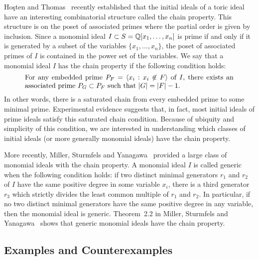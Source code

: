 Ho\c{s}ten and Thomas~\cite{MR2000b:13037} recently established that
the initial ideals of a toric ideal have an interesting combinatorial
structure called the chain property.  This structure is on the poset
of associated primes where the partial order is given by inclusion.
Since a monomial ideal $I \subset S = {\mathbb Q}[x_{1}, \dotsc, x_{n}]$ is
prime if and only if it is generated by a subset of the variables $\{
x_{1}, \dotsc, x_{n}\}$, the poset of associated primes of $I$ is
contained in the power set of the variables.  We say that a monomial
ideal $I$ has the chain property if the
following condition holds:
\[
\text{\begin{minipage}[t]{300pt}
For any embedded prime $P_{F} = \langle x_{i} : x_{i} \not\in F
\rangle$ of $I$, there exists an associated prime $P_{G} \subset
P_{F}$ such that $|G| = |F|-1$.
\end{minipage}}
\]
In other words, there is a saturated chain from every embedded prime
to some minimal prime.  
Experimental evidence suggests that, in fact, most initial ideals 
of prime ideals satisfy this saturated chain condition.
Because
of ubiquity and simplicity of this condition, we are interested in
understanding which classes of initial ideals (or more generally
monomial ideals) have the chain property.  

More recently, Miller, Sturmfels and Yanagawa~\cite{MR1769661}
provided a large class of monomial ideals with the chain property.  A
monomial ideal $I$ is called generic
when the following condition holds: if two distinct minimal generators
$r_{1}$ and $r_{2}$ of $I$ have the same positive degree in some
variable $x_{i}$, there is a third generator $r_{3}$ which strictly
divides the least common multiple of $r_{1}$ and $r_{2}$.  In
particular, if no two distinct minimal generators have the same
positive degree in any variable, then the monomial ideal is generic.
Theorem~2.2 in Miller, Sturmfels and Yanagawa~\cite{MR1769661} shows
that generic monomial ideals have the chain property.


\subsection*{Examples and Counterexamples}


